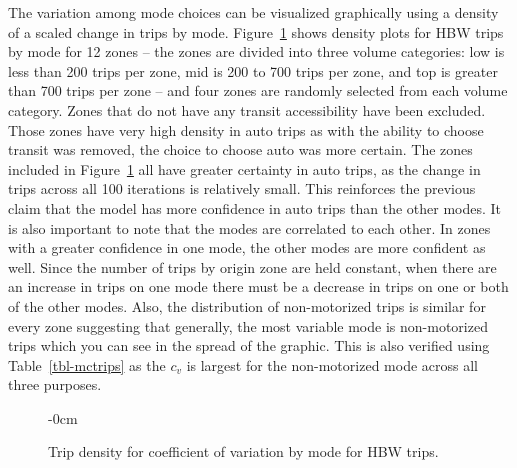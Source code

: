 \documentclass[
  futuretransp,
  submit,
  moreauthors,
]{Definitions/mdpi}
\begin{document}
The variation among mode choices can be visualized graphically using a
density of a scaled change in trips by mode.
Figure~\ref{fig-modechoicetrips} shows density plots for HBW trips by
mode for 12 zones -- the zones are divided into three volume categories:
low is less than 200 trips per zone, mid is 200 to 700 trips per zone,
and top is greater than 700 trips per zone -- and four zones are
randomly selected from each volume category. Zones that do not have any
transit accessibility have been excluded. Those zones have very high
density in auto trips as with the ability to choose transit was removed,
the choice to choose auto was more certain. The zones included in
Figure~\ref{fig-modechoicetrips} all have greater certainty in auto
trips, as the change in trips across all 100 iterations is relatively
small. This reinforces the previous claim that the model has more
confidence in auto trips than the other modes. It is also important to
note that the modes are correlated to each other. In zones with a
greater confidence in one mode, the other modes are more confident as
well. Since the number of trips by origin zone are held constant, when
there are an increase in trips on one mode there must be a decrease in
trips on one or both of the other modes. Also, the distribution of
non-motorized trips is similar for every zone suggesting that generally,
the most variable mode is non-motorized trips which you can see in the
spread of the graphic. This is also verified using
Table~\ref{tbl-mctrips} as the \(c_v\) is largest for the non-motorized
mode across all three purposes.

\begin{figure}
  \begin{adjustwidth}{-\extralength}{0cm}
\end{adjustwidth}
\caption{\label{fig-modechoicetrips}Trip density for coefficient of
variation by mode for HBW trips.}

\end{figure}%
\end{document}
